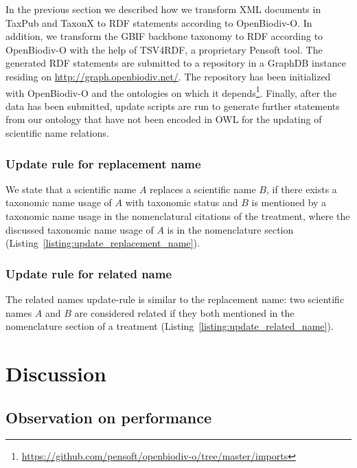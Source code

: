 In the previous section we described how we transform XML documents in TaxPub and TaxonX to RDF statements according to OpenBiodiv-O. In addition, we transform the GBIF backbone taxonomy to RDF according to OpenBiodiv-O with the help of TSV4RDF, a proprietary Pensoft tool. The generated RDF statements are submitted to a repository in a GraphDB instance residing on \url{http://graph.openbiodiv.net/}. The repository has been initialized with OpenBiodiv-O and the ontologies on which it depends\footnote{\url{https://github.com/pensoft/openbiodiv-o/tree/master/imports}}. Finally, after the data has been submitted, update scripts are run to generate further statements from our ontology that have not been encoded in OWL for the updating of scientific name relations.

\subsubsection{Update rule for replacement name}

We state that a scientific name $A$ replaces a scientific name $B$, if there exists a taxonomic name usage of $A$ with taxonomic status  and $B$ is mentioned by a taxonomic name usage in the nomenclatural citations of the treatment, where the discussed taxonomic name usage of $A$ is in the nomenclature section (Listing~\ref{listing:update_replacement_name}).



\subsubsection{Update rule for related name}

The related names update-rule is similar to the replacement name: two scientific names $A$ and $B$ are considered related if they both mentioned in the nomenclature section of a treatment (Listing~\ref{listing:update_related_name}).



\section{Discussion}

\subsection{Observation on performance}


